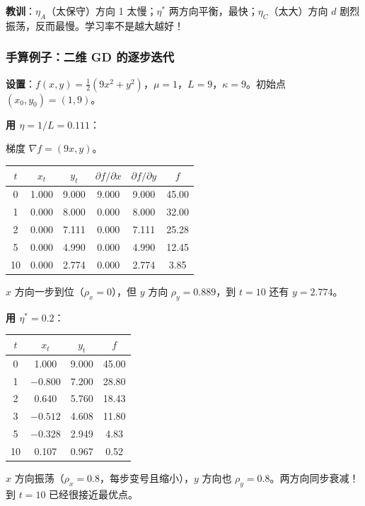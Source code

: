 \documentclass[12pt, a4paper]{ctexart}
\begin{document}
\textbf{教训}：$\eta_A$（太保守）方向 1 太慢；$\eta^*$ 两方向平衡，最快；$\eta_C$（太大）方向 $d$ 剧烈振荡，反而最慢。学习率不是越大越好！

\subsubsection{手算例子：二维 GD 的逐步迭代}

\textbf{设置}：$f(x,y) = \frac{1}{2}(9x^2 + y^2)$，$\mu = 1$，$L = 9$，$\kappa = 9$。初始点 $(x_0, y_0) = (1, 9)$。

\textbf{用 $\eta = 1/L = 0.111$}：

梯度 $\nabla f = (9x, y)$。

\begin{center}
\begin{tabular}{c|cc|cc|c}
$t$ & $x_t$ & $y_t$ & $\partial f/\partial x$ & $\partial f/\partial y$ & $f$ \\
\hline
0 & 1.000 & 9.000 & 9.000 & 9.000 & 45.00 \\
1 & 0.000 & 8.000 & 0.000 & 8.000 & 32.00 \\
2 & 0.000 & 7.111 & 0.000 & 7.111 & 25.28 \\
5 & 0.000 & 4.990 & 0.000 & 4.990 & 12.45 \\
10 & 0.000 & 2.774 & 0.000 & 2.774 & 3.85 \\
\end{tabular}
\end{center}

$x$ 方向一步到位（$\rho_x = 0$），但 $y$ 方向 $\rho_y = 0.889$，到 $t=10$ 还有 $y = 2.774$。

\textbf{用 $\eta^* = 0.2$}：

\begin{center}
\begin{tabular}{c|cc|c}
$t$ & $x_t$ & $y_t$ & $f$ \\
\hline
0 & 1.000 & 9.000 & 45.00 \\
1 & $-0.800$ & 7.200 & 28.80 \\
2 & 0.640 & 5.760 & 18.43 \\
3 & $-0.512$ & 4.608 & 11.80 \\
5 & $-0.328$ & 2.949 & 4.83 \\
10 & 0.107 & 0.967 & 0.52 \\
\end{tabular}
\end{center}

$x$ 方向振荡（$\rho_x = 0.8$，每步变号且缩小），$y$ 方向也 $\rho_y = 0.8$。两方向同步衰减！到 $t=10$ 已经很接近最优点。
\end{document}
